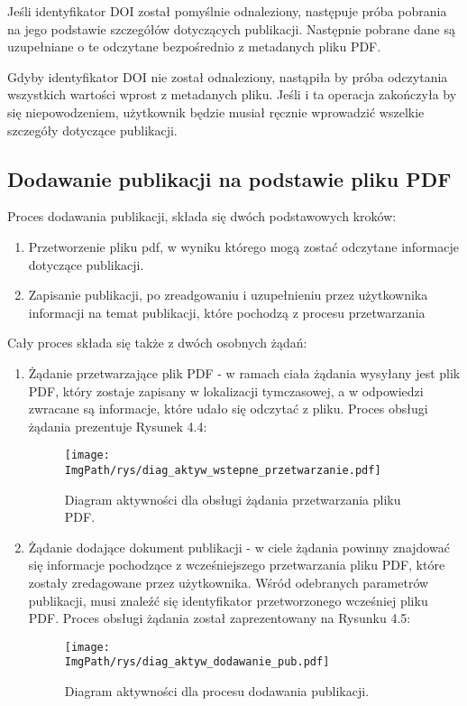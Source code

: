 \documentclass[a4paper,12pt,twoside,openany]{report}
\newcommand{\ImgPath}{.}
\begin{document}
Jeśli identyfikator DOI został pomyślnie odnaleziony, następuje próba pobrania na jego podstawie szczegółów dotyczących publikacji. Następnie pobrane dane są uzupełniane o te odczytane bezpośrednio z metadanych pliku PDF.

Gdyby identyfikator DOI nie został odnaleziony, nastąpiła by próba odczytania wszystkich wartości wprost z metadanych pliku. Jeśli i ta operacja zakończyła by się niepowodzeniem, użytkownik będzie musiał ręcznie wprowadzić wszelkie szczegóły dotyczące publikacji.

\subsection{Dodawanie publikacji na podstawie pliku PDF}
Proces dodawania publikacji, składa się dwóch podstawowych kroków:
\begin{enumerate}
	\item Przetworzenie pliku pdf, w wyniku którego mogą zostać odczytane informacje dotyczące publikacji.
	\item Zapisanie publikacji, po zreadgowaniu i uzupełnieniu przez użytkownika informacji na temat publikacji, które pochodzą z procesu przetwarzania
\end{enumerate}
Cały proces składa się także z dwóch osobnych żądań: 
\begin{enumerate}	
	\item Żądanie przetwarzające plik PDF - w ramach ciała żądania wysyłany jest plik PDF, który zostaje zapisany w lokalizacji tymczasowej, a w odpowiedzi zwracane są informacje, które udało się odczytać z pliku.  Proces obsługi żądania prezentuje Rysunek 4.4:
	\begin{figure}[!htbp]
		\begin{center}
			\centering
			\texttt{[image: \\ImgPath/rys/diag\_aktyw\_wstepne\_przetwarzanie.pdf]}
		\end{center}
		\caption{Diagram aktywności dla obsługi żądania przetwarzania pliku PDF.}
		\label{diagramAktywnosciDodawanie}
	\end{figure}
	
	\item Żądanie dodające dokument publikacji - w ciele żądania powinny znajdować się informacje pochodzące z wcześniejszego przetwarzania pliku PDF, które zostały zredagowane przez użytkownika. Wśród odebranych parametrów publikacji, musi znaleźć się identyfikator przetworzonego wcześniej pliku PDF. Proces obsługi żądania został zaprezentowany na Rysunku 4.5:
	\begin{figure}[!htbp]
		\begin{center}
			\centering
			\texttt{[image: \\ImgPath/rys/diag\_aktyw\_dodawanie\_pub.pdf]}
		\end{center}
		\caption{Diagram aktywności dla procesu dodawania publikacji.}
		\label{diagramAktywnosciDodawanie}
	\end{figure}
	
\end{enumerate}
\end{document}
